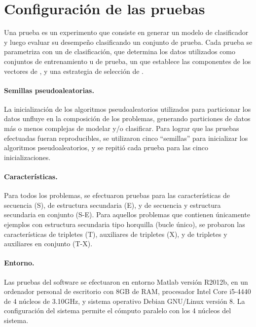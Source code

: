 %
%
%
\section{Configuración de las pruebas}
%
Una prueba es un experimento que consiste en generar un modelo de
clasificador y luego evaluar su desempeño clasificando un conjunto de
prueba.
Cada prueba se parametriza con un  de clasificación, que
determina los datos utilizados como conjuntos de entrenamiento u de
prueba, un  que establece las componentes de
los vectores de , y una estrategia de selección de .

\paragraph{Semillas pseudoaleatorias.}
La inicialización de los algoritmos pseudoaleatorios utilizados para
particionar los datos unfluye en la composición de los problemas,
generando particiones de datos más o menos complejas de modelar y/o
clasificar.
Para lograr que las pruebas efectuadas fueran reproducibles, se
utilizaron cinco ``semillas'' para inicializar los algoritmos
pseudoaleatorios, y se repitió cada prueba para las cinco
inicializaciones.

\paragraph{Características.}
Para todos los problemas, se efectuaron pruebas para las
características de secuencia (S), de estructura secundaria (E), y de
secuencia y estructura secundaria en conjunto (S-E).
Para aquellos problemas que contienen únicamente ejemplos con
estructura secundaria tipo horquilla (bucle único), se probaron las
características de tripletes (T), auxiliares de tripletes (X), y de
tripletes y auxiliares en conjunto (T-X).

\paragraph{Entorno.}
Las pruebas del software se efectuaron en entorno Matlab versión
R2012b, en un ordenador personal de escritorio con 8GB de RAM,
procesador Intel Core i5-4440 de 4 núcleos de 3.10GHz, y sistema
operativo Debian GNU/Linux versión 8.
La configuración del sistema permite el cómputo paralelo con los 4
núcleos del sistema.

